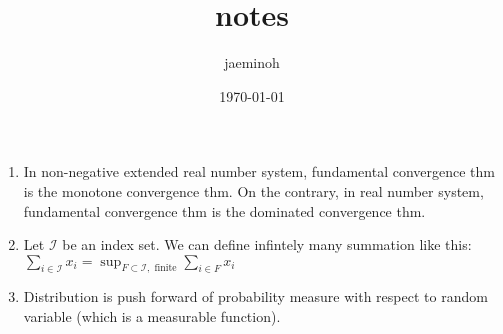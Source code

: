 \documentclass{amsart}
\date{\today}
\title{notes}
\author{jaeminoh}
\begin{document}
\maketitle

\begin{enumerate}
    \item In non-negative extended real number system, fundamental convergence thm is the monotone convergence thm. On the contrary, in real number system, fundamental convergence thm is the dominated convergence thm.\\
    \item Let $\mathcal{I}$ be an index set. We can define infintely many summation like this: $\sum_{i \in \mathcal{I}} x_i = \sup_{F \subset \mathcal{I},\text{ finite}}\sum_{i \in F} x_i$\\
    \item Distribution is push forward of probability measure with respect to random variable (which is a measurable function).
    
\end{enumerate}
\end{document}
